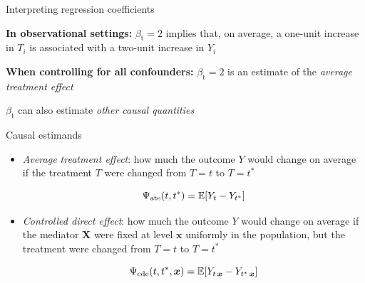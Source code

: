 \documentclass{beamer}
\theoremstyle{remark}
\newcommand{\x}{\bm x}
\newcommand{\X}{\bm X}
\newcommand{\ate}{\Psi_\text{ate} \paren*{t, t^*}}
\newcommand{\cde}{\Psi_\text{cde} \paren*{t, t^*, \x}}
\DeclarePairedDelimiter{\paren}{(}{)}
\DeclarePairedDelimiter{\brac}{[}{]}
\newcommand{\E}[2][]{%
   \ifthenelse{ \equal{#1}{} }
      {\ensuremath{\mathbb{E} \brac*{#2}}}
      {\ensuremath{\mathbb{E} \brac*{#2 \mid #1}}}
}
\begin{document}
\begin{frame}{Interpreting regression coefficients}

    \textbf{In observational settings:} $\beta_\text{t} = 2$ implies that, on average, a one-unit increase in $T_i$ is associated with a two-unit increase in $Y_i$

    \textbf{When controlling for all confounders:} $\beta_\text{t} = 2$ is an estimate of the \emph{average treatment effect}

    $\beta_\text{t}$ can also estimate \emph{other causal quantities} \citep{vanderweele_explanation_2015}

\end{frame}

\begin{frame}{Causal estimands}

    \begin{itemize}
        \item \emph{Average treatment effect}: how much the outcome $Y$ would change on average if the treatment $T$ were changed from $T = t$ to $T = t^*$

              \begin{equation*}
                  \ate = \E{Y_t - Y_{t^*}}
              \end{equation*}


        \item \emph{Controlled direct effect}: how much the outcome $Y$ would change on average if the mediator $\X$ were fixed at level $\x$ uniformly in the population, but the treatment were changed from $T = t$ to $T = t^*$

              \begin{equation*}
                  \cde = \E{Y_{t \, \x} - Y_{t^* \, \x}}
              \end{equation*}

    \end{itemize}

\end{frame}
\end{document}
